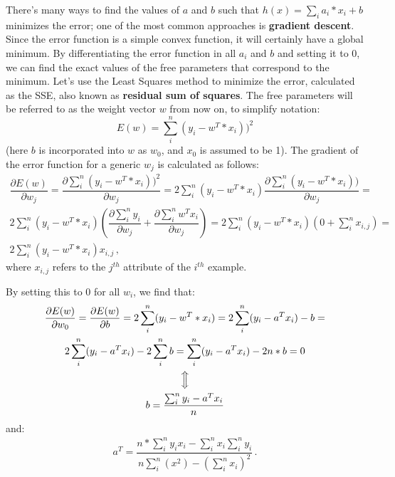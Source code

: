 There's many ways to find the values of $a$ and $b$ such that $h(x) = \sum_i a_i * x_i + b$ minimizes the error; one of the most common approaches is \textbf{gradient descent}. Since the error function is a simple convex function, it will certainly have a global minimum. By differentiating the error function in all $a_i$ and $b$ and setting it to 0, we can find the exact values of the free parameters that correspond to the minimum. Let's use the Least Squares method to minimize the error, calculated as the SSE, also known as \textbf{residual sum of squares}. The free parameters will be referred to as the weight vector $w$ from now on, to simplify notation:
\begin{equation*}
    E(w) = \sum_i^n (y_i - w^T*x_i))^2 
\end{equation*}
(here $b$ is incorporated into $w$ as $w_0$, and $x_0$ is assumed to be 1). The gradient of the error function for a generic $w_j$ is calculated as follows:
\begin{gather*}
    \dfrac{\partial E(w)}{\partial w_j} = \dfrac{\partial \sum_i^n (y_i - w^T*x_i))^2}{\partial w_j} = 2 \sum_i^n (y_i - w^T*x_i) \dfrac{\partial \sum_i^n (y_i - w^T*x_i))}{\partial w_j} = \\
    2 \sum_i^n (y_i - w^T*x_i) (\dfrac{\partial \sum_i^n y_i}{\partial w_j} +\dfrac{\partial \sum_i^n w^T x_i}{\partial w_j}) = 2 \sum_i^n (y_i - w^T*x_i) ( 0 + \sum_i^n x_{i,j}) = \\
    2 \sum_i^n (y_i - w^T*x_i) x_{i,j} \,,
\end{gather*}
where $x_{i,j}$ refers to the $j^{th}$ attribute of the $i^{th}$ example.

By setting this to 0 for all $w_i$, we find that:
\begin{gather*}
    \dfrac{\partial E(w)}{\partial w_0} = \dfrac{\partial E(w)}{\partial b} = 2 \sum_i^n (y_i - w^T*x_i) = 2 \sum_i^n (y_i - a^Tx_i) - b = \\
    2 \sum_i^n (y_i - a^Tx_i) - 2\sum_i^n b = \sum_i^n (y_i - a^Tx_i) - 2n*b = 0 \\
    \Big\Updownarrow \\
    b = \dfrac{\sum_i^n y_i - a^Tx_i}{n}
\end{gather*}
and:
\begin{gather*}
    a^T = \dfrac{n * \sum_i^n y_i x_i - \sum_i^n x_i \sum_i^n y_i}{n\sum_i^n (x^2) - (\sum_i^n x_i)^2} \,.
\end{gather*}

